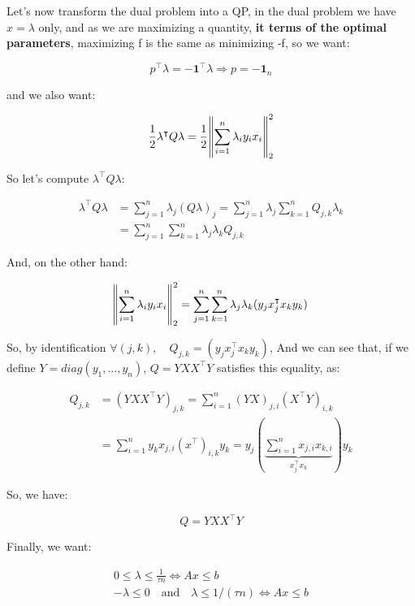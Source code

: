 \documentclass[11pt]{article}
\numberwithin{figure}{section} %
\begin{document}
Let's now transform the dual problem into a QP, in the dual problem we have $x = \lambda$ only, and as we are maximizing a quantity,
\textbf{it terms of the optimal parameters}, maximizing f is the same as minimizing -f, so we want:

\begin{framed} 
$$
p^{\intercal} \lambda = - \mathbf{1}^{\intercal} \lambda \Rightarrow p = -\mathbf{1}_n
$$
\end{framed} 

and we also want:

$$
\frac{1}{2} \lambda^{\intercal} Q \lambda = \frac{1}{2} \norm{\sum\limits_{i=1}^n \lambda_i y_i x_i }^{2}_2
$$

So let's compute $\lambda^{\intercal} Q \lambda$:

\begin{align*}
\lambda^{\intercal} Q \lambda &= \sum\limits_{j=1}^n \lambda_j (Q\lambda)_j = \sum\limits_{j=1}^n \lambda_j \sum\limits_{k=1}^n Q_{j,k} \lambda_k \\
&= \sum\limits_{j=1}^n \sum\limits_{k=1}^n \lambda_j \lambda_k Q_{j,k}
\end{align*}

And, on the other hand:

\begin{align*}
\norm{\sum\limits_{i=1}^n \lambda_i y_i x_i }^{2}_2 = \sum\limits_{j=1}^n \sum\limits_{k=1}^n \lambda_j \lambda_k (y_j x^{\intercal}_j x_k y_k)
\end{align*}

So, by identification $\forall (j,k), \quad Q_{j,k} = (y_j x^{\intercal}_j x_k y_k)$, And we can see that, if we define $Y = diag(y_1, \hdots, y_n)$,  $Q = YXX^{\intercal}Y$ satisfies this equality, as:

\begin{align*}
Q_{j,k} &= (YXX^{\intercal}Y)_{j,k} = \sum\limits_{i=1}^n (YX)_{j,i} (X^{\intercal}Y)_{i,k} \\
&= \sum\limits_{i = 1}^n y_k x_{j,i} (x^{\intercal})_{i,k} y_k = y_j (\underbrace{\sum\limits_{i=1}^n x_{j,i} x_{k, i}}_\text{$x^{\intercal}_j x_k$}) y_k
\end{align*}

So, we have:

\begin{framed}
$$
Q = YXX^{\intercal}Y
$$
\end{framed}

Finally, we want:

\begin{align*}
0 \leq \lambda \leq \frac{1}{\tau n} \Leftrightarrow Ax \leq b \\
-\lambda \leq 0 \quad\text{and}\quad \lambda \leq 1/(\tau n) \Leftrightarrow Ax \leq b
\end{align*}
\end{document}
